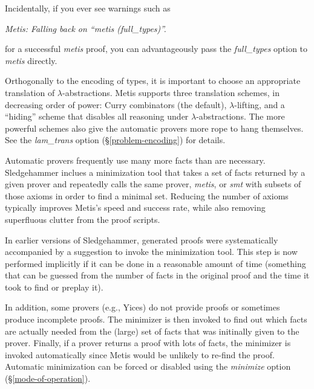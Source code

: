 \documentclass[a4paper,12pt]{article}
\begin{document}
Incidentally, if you ever see warnings such as

\prew
\slshape
Metis: Falling back on ``\textit{metis} (\textit{full\_types})''.
\postw

for a successful \textit{metis} proof, you can advantageously pass the
\textit{full\_types} option to \textit{metis} directly.


Orthogonally to the encoding of types, it is important to choose an appropriate
translation of $\lambda$-abstractions. Metis supports three translation schemes,
in decreasing order of power: Curry combinators (the default),
$\lambda$-lifting, and a ``hiding'' scheme that disables all reasoning under
$\lambda$-abstractions. The more powerful schemes also give the automatic
provers more rope to hang themselves. See the \textit{lam\_trans} option (\S\ref{problem-encoding}) for details.


Automatic provers frequently use many more facts than are necessary.
Sledgehammer inclues a minimization tool that takes a set of facts returned by a
given prover and repeatedly calls the same prover, \textit{metis}, or
\textit{smt} with subsets of those axioms in order to find a minimal set.
Reducing the number of axioms typically improves Metis's speed and success rate,
while also removing superfluous clutter from the proof scripts.

In earlier versions of Sledgehammer, generated proofs were systematically
accompanied by a suggestion to invoke the minimization tool. This step is now
performed implicitly if it can be done in a reasonable amount of time (something
that can be guessed from the number of facts in the original proof and the time
it took to find or preplay it).

In addition, some provers (e.g., Yices) do not provide proofs or sometimes
produce incomplete proofs. The minimizer is then invoked to find out which facts
are actually needed from the (large) set of facts that was initinally given to
the prover. Finally, if a prover returns a proof with lots of facts, the
minimizer is invoked automatically since Metis would be unlikely to re-find the
proof.
%
Automatic minimization can be forced or disabled using the \textit{minimize}
option (\S\ref{mode-of-operation}).

\end{document}
